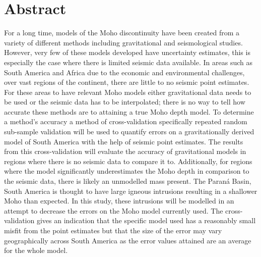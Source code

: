 \section*{Abstract}

For a long time, models of the Moho discontinuity have been created from a variety of different methods including gravitational and seismological studies. However, very few of these models developed have uncertainty estimates, this is especially the case where there is limited seismic data available. In areas such as South America and Africa due to the economic and environmental challenges, over vast regions of the continent, there are little to no seismic point estimates. For these areas to have relevant Moho models either gravitational data needs to be used or the seismic data has to be interpolated; there is no way to tell how accurate these methods are to attaining a true Moho depth model. To determine a method's accuracy a method of cross-validation specifically repeated random sub-sample validation will be used to quantify errors on a gravitationally derived model of South America with the help of seismic point estimates. The results from this cross-validation will evaluate the accuracy of gravitational models in regions where there is no seismic data to compare it to. Additionally, for regions where the model significantly underestimates the Moho depth in comparison to the seismic data, there is likely an unmodelled mass present. The Paraná Basin, South America is thought to have large igneous intrusions resulting in a shallower Moho than expected. In this study, these intrusions will be modelled in an attempt to decrease the errors on the Moho model currently used. The cross-validation gives an indication that the specific model used has a reasonably small misfit from the point estimates but that the size of the error may vary geographically across South America as the error values attained are an average for the whole model.


